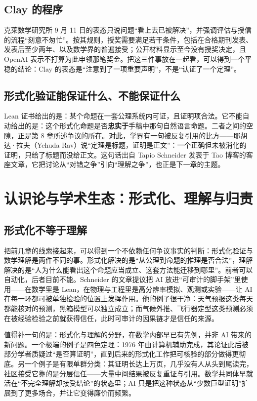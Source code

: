 \subsection{Clay 的程序}

克莱数学研究所 9 月 11 日的表态\cite{clay-news}只说问题“看上去已被解决”，并强调评估与授信的流程“刻意不匆忙”。按其规则，授奖需要满足若干条件，包括在合格期刊发表、发表后至少两年、以及数学界的普遍接受；公开材料显示至今没有授奖决定，且 OpenAI 表示不打算为此申领那笔奖金。把这三件事放在一起看，可以得到一个平稳的结论：Clay 的表态是“注意到了一项重要声明”，不是“认证了一个定理”。

\subsection{形式化验证能保证什么、不能保证什么}

Lean 证书给出的是：某个命题在一套公理系统内可证，且证明项合法。它不能自动给出的是：这个形式化命题是否\textbf{忠实于}手稿中那句自然语言命题。二者之间的空隙，正是第 8 章所述争议的所在。对此，学界有一句被反复引用的比方——耶胡达·拉夫（Yehuda Rav）说“定理是标题，证明是正文”：一个正确但未被消化的证明，只给了标题而没给正文。这句话出自 Tapio Schneider 发表于 Tao 博客的客座文章\cite{schneider}，它把讨论从“对错之争”引向“理解之争”，也正是下一章的主题。

\section{认识论与学术生态：形式化、理解与归责}

\subsection{形式化不等于理解}

把前几章的线索接起来，可以得到一个不依赖任何争议事实的判断：形式化验证与数学理解是两件不同的事。形式化解决的是“从公理到命题的推理是否合法”，理解解决的是“人为什么能看出这个命题应当成立、这套方法能迁移到哪里”。前者可以自动化，后者目前不能。Schneider 的文章提议把 AI 放进“可审计的脚手架”里使用——在数学里是 Lean，在物理与工程里是高分辨率模拟、观测或实验——让 AI 在每一环都可被单独检验的位置上发挥作用。他的例子很干净：天气预报这类每天都能核对的预测，黑箱模型可以独立成立；而气候外推、飞行器定型这类预测必须在被经验检验之前就获得信任，此时可审计的因果链才是信任的来源。

值得补一句的是：形式化与理解的分野，在数学内部早已有先例，并非 AI 带来的新问题。一个极端的例子是四色定理：1976 年由计算机辅助完成，其论证此后被部分学者质疑过“是否算证明”，直到后来的形式化工作把可核验的部分做得更彻底。另一个例子是有限单群分类：其证明长达上万页，几乎没有人从头到尾读完，社区接受它靠的是分层信任——大量中间结果被反复重证与引用。数学共同体早就活在“不完全理解却接受结论”的状态里；AI 只是把这种状态从“少数巨型证明”扩展到了更多场合，并让它变得廉价而频繁。


